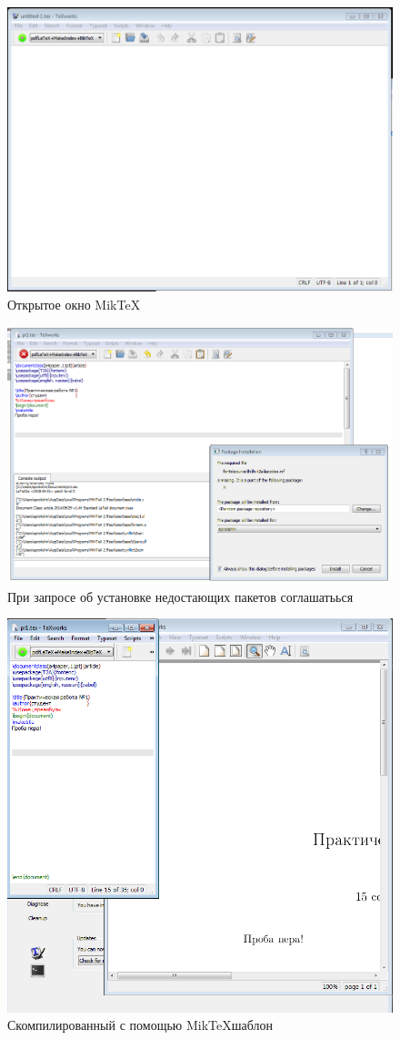 \documentclass[a4paper,11pt]{article}
\begin{document}
\begin{figure}[!ht]
\centering
\caption{Открытое окно Mik\TeX}
\includegraphics[width=0.48\linewidth]{miktexa.png}
\end{figure}
\begin{figure}[!ht]
\centering
\caption{При запросе об установке недостающих пакетов соглашатьься}
\includegraphics[width=0.48\linewidth]{miktexb.png}
\end{figure}
\begin{figure}[!ht]
\centering
\caption{Скомпилированный с помощью  Mik\TeX шаблон}
\includegraphics[width=0.48\linewidth]{miktexc.png}
\end{figure}
\end{document}
